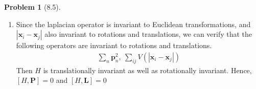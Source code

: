 \documentclass[twoside,11pt]{article}
\theoremstyle{definition}
\newtheorem{problem}{Problem}
\theoremstyle{remark}
\begin{document}
\begin{problem}[8.5]
\begin{enumerate}[label=(\alph*)]
\begin{proof}
\begin{align*}
    &= 2\sum_{nj}\epsilon_{\alpha\beta\gamma}\frac{1}{r^k_{nj}}x_{n\beta}p_{n\gamma}
    - 2\sum_{nj}\epsilon_{\alpha\beta\gamma}x_{n\beta}\left(
        i\hbar k \frac{x_{n\gamma} - x_{j\gamma}}{r_{nj}^{k+2}} + \frac{1}{r^k_{nj}}p_{n\gamma}
    \right)\\
    &= -2i\hbar k \sum_{nj}\epsilon_{\alpha\beta\gamma}x_{n\beta}\frac{x_{n\gamma}-x_{j\gamma}}{r_{nj}^{k+2}}
\end{align*}
Since
\begin{align*}
    \sum_{nj}\epsilon_{\alpha\beta\gamma}x_{n\beta}x_{n\gamma} &= 0\\
    \sum_{nj}\epsilon_{\alpha\beta\gamma}x_{n\beta}x_{j\gamma} &= 
    \sum_{n<j}\epsilon_{\alpha\beta\gamma}(x_{n\beta}x_{j\gamma} + x_{j\beta}x_{n\gamma})\\
    &=
    \sum_{n<j}\epsilon_{\alpha\beta\gamma}(x_{n\beta}x_{j\gamma} - x_{j\gamma}x_{n\beta})
    = 0
\end{align*}
Therefore we have
\begin{align*}
    \left[\sum_{nj}\frac{1}{r^k_{nj}}, \sum_n L_{n\alpha}\right] &= 0 \qedhere
\end{align*}
\end{proof}
According to these two claims, we have $[H,\mathbf{L}] = 0$.


\item Since the laplacian operator is invariant to Euclidean transformations,
and $|\mathbf{x}_i-\mathbf{x}_j|$ also invariant to rotations and translations,
we can verify that the following operators are invariant to rotations and translations.
\begin{align*}
    \sum_n \mathbf{p}_n^2,\
    \sum_{ij} V(|\mathbf{x}_i-\mathbf{x}_j|)
\end{align*}
Then $H$ is translationally invariant as well as rotationally invariant.
Hence, $[H, \mathbf{P}]=0$ and $[H,\mathbf{L}]=0$

\end{enumerate}
\end{problem}







\end{document}
